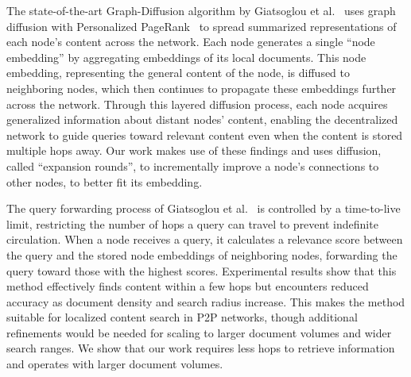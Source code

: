 The state-of-the-art Graph-Diffusion algorithm by Giatsoglou et al.~\cite{giatsoglou2022graph} uses graph diffusion with Personalized PageRank~\cite{gasteiger2018predict} to spread summarized representations of each node’s content across the network. Each node generates a single ``node embedding'' by aggregating embeddings of its local documents. This node embedding, representing the general content of the node, is diffused to neighboring nodes, which then continues to propagate these embeddings further across the network. Through this layered diffusion process, each node acquires generalized information about distant nodes’ content, enabling the decentralized network to guide queries toward relevant content even when the content is stored multiple hops away.
Our work makes use of these findings and uses diffusion, called ``expansion rounds'', to incrementally improve a node's connections to other nodes, to better fit its embedding.

The query forwarding process of Giatsoglou et al.~\cite{giatsoglou2022graph} is controlled by a time-to-live limit, restricting the number of hops a query can travel to prevent indefinite circulation. When a node receives a query, it calculates a relevance score between the query and the stored node embeddings of neighboring nodes, forwarding the query toward those with the highest scores. Experimental results show that this method effectively finds content within a few hops but encounters reduced accuracy as document density and search radius increase. This makes the method suitable for localized content search in P2P networks, though additional refinements would be needed for scaling to larger document volumes and wider search ranges.
We show that our work requires less hops to retrieve information and operates with larger document volumes.
